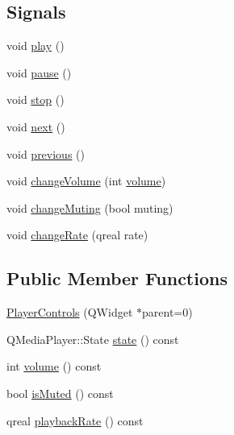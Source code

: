 \subsection*{Signals}
\begin{DoxyCompactItemize}
\item 
void \hyperlink{class_player_controls_a1983a779ec9fc6c00def119ac53b8663}{play} ()
\item 
void \hyperlink{class_player_controls_abeaa95aaebcd2dbe9e9cb8f651f7e779}{pause} ()
\item 
void \hyperlink{class_player_controls_a3e4833b52d2cb01ae032eff9a471dad7}{stop} ()
\item 
void \hyperlink{class_player_controls_a6d46fd13e437d9c178f8f93eac32a4bb}{next} ()
\item 
void \hyperlink{class_player_controls_a527a76e82b100d4b9f82c87ecd0afe1d}{previous} ()
\item 
void \hyperlink{class_player_controls_a94314700c550bb2b4b5bc83871010207}{change\-Volume} (int \hyperlink{class_player_controls_aa5b799627701db4d8c7d6165a43590be}{volume})
\item 
void \hyperlink{class_player_controls_a985422768fb2d9df32984b20627dbd6a}{change\-Muting} (bool muting)
\item 
void \hyperlink{class_player_controls_a6fc3ad3f0791da69589dbb7004a24e6b}{change\-Rate} (qreal rate)
\end{DoxyCompactItemize}
\subsection*{Public Member Functions}
\begin{DoxyCompactItemize}
\item 
\hyperlink{class_player_controls_ab28990280e8e45114a73c11563a47b60}{Player\-Controls} (Q\-Widget $\ast$parent=0)
\item 
Q\-Media\-Player\-::\-State \hyperlink{class_player_controls_a2c767433c197631836b4f757f3d5cceb}{state} () const 
\item 
int \hyperlink{class_player_controls_aa5b799627701db4d8c7d6165a43590be}{volume} () const 
\item 
bool \hyperlink{class_player_controls_aeddcb0969ba69e9514ef1de5ffb821c5}{is\-Muted} () const 
\item 
qreal \hyperlink{class_player_controls_a05ee8765f5f811dfcc2e00c93435be38}{playback\-Rate} () const 
\end{DoxyCompactItemize}


